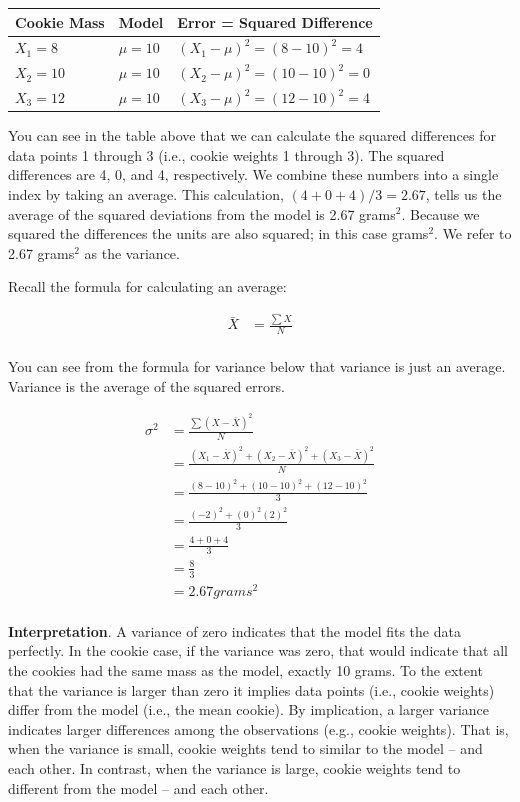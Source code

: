 \documentclass[
]{krantz}
\begin{document}
\begin{longtable}[]{@{}lll@{}}
\toprule
Cookie Mass & Model & Error = Squared Difference\tabularnewline
\midrule
\endhead
\(X_1 = 8\) & \(\mu = 10\) & \((X_1 - \mu)^2 =(8 - 10)^2= 4\)\tabularnewline
\(X_2 = 10\) & \(\mu = 10\) & \((X_2 - \mu)^2 =(10 - 10)^2= 0\)\tabularnewline
\(X_3 = 12\) & \(\mu = 10\) & \((X_3 - \mu)^2 =(12 - 10)^2= 4\)\tabularnewline
\bottomrule
\end{longtable}

You can see in the table above that we can calculate the squared differences for data points 1 through 3 (i.e., cookie weights 1 through 3). The squared differences are 4, 0, and 4, respectively. We combine these numbers into a single index by taking an average. This calculation, \((4 + 0 + 4)/3 = 2.67\), tells us the average of the squared deviations from the model is 2.67 grams\(^2\). Because we squared the differences the units are also squared; in this case grams\(^2\). We refer to 2.67 grams\(^2\) as the variance.

Recall the formula for calculating an average:

\[
\begin{aligned} 
\bar{X} &= \frac{\sum{X}}{N} \\
\end{aligned} 
\]

You can see from the formula for variance below that variance is just an average. Variance is the average of the squared errors.

\[
\begin{aligned} 
\sigma^2 &= \frac{\sum{(X - \bar{X})^2}}{N}\\
&= \frac{(X_1-\bar{X})^2 + (X_2-\bar{X})^2 + (X_3-\bar{X})^2}{N}  \\ 
&= \frac{(8-10)^2 + (10-10)^2 + (12-10)^2}{3}\\
&= \frac{(-2)^2 + (0)^2 (2)^2}{3} \\
&= \frac{4 + 0 + 4}{3} \\
&= \frac{8}{3} \\
&= 2.67 grams^2 \\
\end{aligned} 
\]

\textbf{Interpretation}. A variance of zero indicates that the model fits the data perfectly. In the cookie case, if the variance was zero, that would indicate that all the cookies had the same mass as the model, exactly 10 grams. To the extent that the variance is larger than zero it implies data points (i.e., cookie weights) differ from the model (i.e., the mean cookie). By implication, a larger variance indicates larger differences among the observations (e.g., cookie weights). That is, when the variance is small, cookie weights tend to similar to the model -- and each other. In contrast, when the variance is large, cookie weights tend to different from the model -- and each other.
\end{document}
